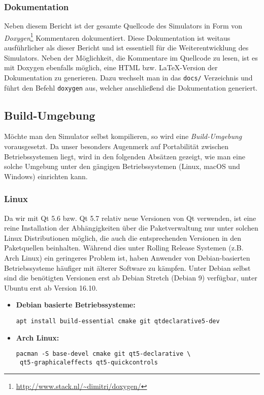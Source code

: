 \subsubsection{Dokumentation}

Neben diesem Bericht ist der gesamte Quellcode des Simulators in Form von
\emph{Doxygen}\footnote{\url{http://www.stack.nl/~dimitri/doxygen/}} Kommentaren
dokumentiert. Diese Dokumentation ist weitaus ausführlicher als dieser Bericht
und ist essentiell für die Weiterentwicklung des Simulators. Neben der
Möglichkeit, die Kommentare im Quellcode zu lesen, ist es mit Doxygen ebenfalls
möglich, eine HTML bzw. \LaTeX -Version der Dokumentation zu generieren. Dazu
wechselt man in das \texttt{docs/} Verzeichnis und führt den Befehl
\texttt{doxygen} aus, welcher anschließend die Dokumentation generiert.

\subsection{Build-Umgebung}

Möchte man den Simulator selbst kompilieren, so wird eine \emph{Build-Umgebung}
vorausgesetzt. Da unser besonders Augenmerk auf Portabilität zwischen
Betriebssystemen liegt, wird in den folgenden Absätzen gezeigt, wie man eine
solche Umgebung unter den gängigen Betriebssystemen (Linux, macOS und Windows)
einrichten kann.

\subsubsection{Linux}

Da wir mit Qt 5.6 bzw. Qt 5.7 relativ neue Versionen von Qt verwenden, ist eine
reine Installation der Abhängigkeiten über die Paketverwaltung nur unter solchen
Linux Distributionen möglich, die auch die entsprechenden Versionen in den
Paketquellen beinhalten. Während dies unter Rolling Release Systemen (z.B. Arch
Linux) ein geringeres Problem ist, haben Anwender von Debian-basierten
Betriebssysteme häufiger mit älterer Software zu kämpfen. Unter Debian selbst
sind die benötigten Versionen erst ab Debian Stretch (Debian 9) verfügbar, unter
Ubuntu erst ab Version 16.10.

\begin{itemize}
	\item \textbf{Debian basierte Betriebssysteme:} \\
	\begin{lstlisting}
apt install build-essential cmake git qtdeclarative5-dev
	\end{lstlisting}

	\item \textbf{Arch Linux:} \\
	\begin{lstlisting}
pacman -S base-devel cmake git qt5-declarative \
 qt5-graphicaleffects qt5-quickcontrols
	\end{lstlisting}
\end{itemize}


